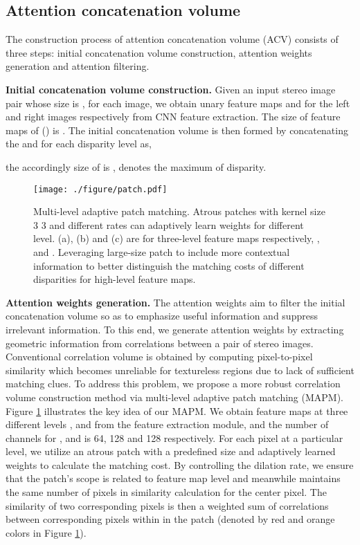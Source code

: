 \documentclass[10pt,twocolumn,letterpaper]{article}
\begin{document}
\subsection{Attention concatenation volume} \label{sec:acv}
The construction process of attention concatenation volume (ACV) consists of three steps: initial concatenation volume construction, attention weights generation and attention filtering.

\textbf{Initial concatenation volume construction.} Given an input stereo image pair whose  size is , for each image, we obtain unary feature maps  and  for the left and right images respectively from CNN feature extraction. The size of feature maps of  () is  . The initial concatenation volume is then formed by concatenating the  and  for each disparity level as,

the accordingly size of  is ,  denotes the maximum of disparity.

\begin{figure}
\centering
{\texttt{[image: ./figure/patch.pdf]}}
\caption{
Multi-level adaptive patch matching. Atrous patches with kernel size 3  3 and different rates can adaptively learn weights for different level. (a), (b) and (c) are for three-level feature maps respectively, ,  and . Leveraging large-size patch to include  more  contextual  information  to  better  distinguish the matching costs of different disparities for high-level feature maps.}\label{fig:patch}
\vspace{-10pt}
\end{figure}

\textbf{Attention weights generation.} \label{sec:att_weighs} The attention weights aim to filter the initial concatenation volume so as to emphasize useful information and suppress irrelevant information. To this end, we generate attention weights by extracting geometric information from correlations between a pair of stereo images. Conventional correlation volume is obtained by computing pixel-to-pixel similarity which becomes unreliable for textureless regions due to lack of sufficient matching clues. To address this problem, we propose a more robust correlation volume construction method via multi-level adaptive patch matching (MAPM). Figure \ref{fig:patch} illustrates the key idea of our MAPM. We obtain feature maps at three different levels ,  and  from the feature extraction module, and the number of channels for ,  and  is 64, 128 and 128 respectively. For each pixel at a particular level, we utilize an atrous patch with a predefined size and adaptively learned weights to calculate the matching cost. By controlling the dilation rate, we ensure that the patch’s scope is related to feature map level and meanwhile maintains the same number of pixels in similarity calculation for the center pixel. The similarity of two corresponding pixels is then a weighted sum of correlations between corresponding pixels within in the patch (denoted by red and orange colors in Figure \ref{fig:patch}).
\end{document}
